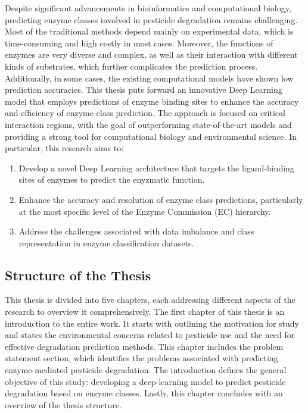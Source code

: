 Despite significant advancements in bioinformatics and computational biology, predicting enzyme classes involved in pesticide degradation remains challenging. Most of the traditional methods depend mainly on experimental data, which is time-consuming and high costly in most cases. Moreover, the functions of enzymes are very diverse and complex, as well as their interaction with different kinds of substrates, which further complicates the prediction process. Additionally, in some cases, the existing computational models have shown low prediction accuracies. This thesis puts forward an innovative Deep Learning model that employs predictions of enzyme binding sites to enhance the accuracy and efficiency of enzyme class prediction. The approach is focused on critical interaction regions, with the goal of outperforming state-of-the-art models and providing a strong tool for computational biology and environmental science. In particular, this research aims to:

\begin{enumerate}[label=(\alph*)]
    \item Develop a novel Deep Learning architecture that targets the ligand-binding sites of enzymes to predict the enyzmatic function.
    \item Enhance the accuracy and resolution of enzyme class predictions, particularly at the most specific level of the Enzyme Commission (EC) hierarchy.
    \item Address the challenges associated with data imbalance and class representation in enzyme classification datasets.
\end{enumerate}

\subsection{Structure of the Thesis}
\label{sec:Structure of the Thesis}

This thesis is divided into five chapters, each addressing different aspects of the research to overview it comprehensively. The first chapter of this thesis is an introduction to the entire work. It starts with outlining the motivation for study and states the environmental concerns related to pesticide use and the need for effective degradation prediction methods. This chapter includes the problem statement section, which identifies the problems associated with predicting enzyme-mediated pesticide degradation. The introduction defines the general objective of this study: developing a deep-learning model to predict pesticide degradation based on enzyme classes. Lastly, this chapter concludes with an overview of the thesis structure.

